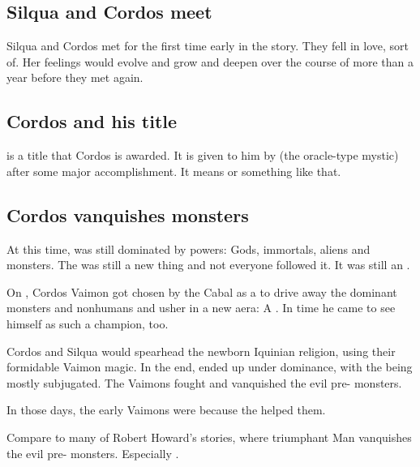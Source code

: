 \subsection{Silqua and Cordos meet}
Silqua and Cordos met for the first time early in the story. 
They fell in love, sort of. 
Her feelings would evolve and grow and deepen over the course of more than a year before they met again. 









\subsection{Cordos and his title}
 is a title that Cordos is awarded. 
It is given to him by \Delphine{} (the oracle-type mystic) after some major accomplishment. 
It means  or something like that. 









\subsection{Cordos vanquishes monsters}
At this time, \Miith{} was still dominated by  powers: 
Gods, immortals, aliens and monsters. 
The  was still a new thing and not everyone followed it. 
It was still an . 

On \Azmith, Cordos Vaimon got chosen by the Cabal as a  to drive away the dominant monsters and nonhumans and usher in a new aera: 
A . 
In time he came to see himself as such a champion, too. 

Cordos and Silqua would spearhead the newborn Iquinian religion, using their formidable Vaimon magic. 
In the end, \Azmith{} ended up under \human{} dominance, with the \scathae{} being mostly subjugated. 
The Vaimons fought and vanquished the evil pre-\human{} monsters. 

In those days, the early Vaimons were  because the \resphain helped them. 

Compare to many of Robert Howard's stories, where triumphant Man vanquishes the evil pre-\human{} monsters. 
Especially \cite{RobertEHoward:TheShadowKingdom}. 

